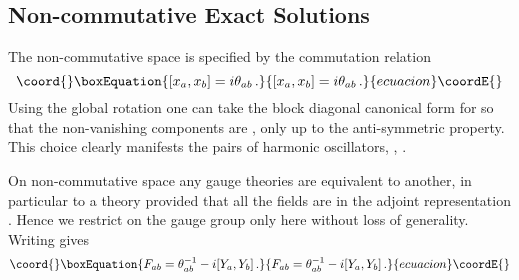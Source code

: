 \documentclass[a4paper,11pt]{article}
\begin{document}
\subsection{Non-commutative Exact Solutions}

The non-commutative space is specified by the commutation relation
\begin{equation}\coord{}\boxEquation{
[x_{a},x_{b}]=i\theta_{ab}\,.
}{
[x_{a},x_{b}]=i\theta_{ab}\,.
}{ecuacion}\coordE{}\end{equation}
Using the global \coordHE{} rotation one can take  the block diagonal canonical  form for \myHighlight{$\theta$}\coordHE{}   so that the non-vanishing components are
\coordHE{}, \coordHE{} only
up to the anti-symmetric property.  This choice clearly manifests  the  \coordHE{} pairs of harmonic oscillators, \coordHE{},
\coordHE{}.



On  non-commutative space  any \coordHE{}   gauge theories  are equivalent to another, in particular to a \coordHE{}  theory provided that all
the fields are in the adjoint representation  \cite{comments}. Hence we  restrict on the \coordHE{} gauge group only here without loss of
generality. Writing \coordHE{} gives
\begin{equation}\coord{}\boxEquation{
F_{ab}=\theta^{-1}_{ab}-i[Y_{a},Y_{b}]\,. \label{non-commF}
}{
F_{ab}=\theta^{-1}_{ab}-i[Y_{a},Y_{b}]\,. }{ecuacion}\coordE{}\end{equation}
\end{document}
